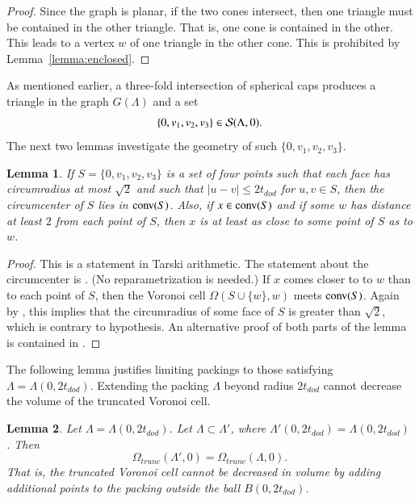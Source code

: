 \documentclass{article} %
\newtheorem{lemma}{Lemma}[subsection]
\begin{document}
\begin{proof} Since the graph is planar, if the two cones
intersect, then one triangle must be contained in the other
triangle.  That is, one cone is contained in the other.  This
leads to a vertex $w$ of one triangle in the other
cone.  This is prohibited
by Lemma~\ref{lemma:enclosed}.
\end{proof}

As mentioned earlier, a three-fold intersection of spherical
caps produces a triangle in the graph $G(\Lambda)$ and a 
set 
$$\{0,v_1,v_2,v_3\}\in {\mathcal S}(\Lambda,0).$$
The next two lemmas investigate the geometry of such $\{0,v_1,v_2,v_3\}$.

\begin{lemma}\label{lemma:Q}
If $S=\{0,v_1,v_2,v_3\}$ is a set of four points such that each
face has circumradius at most $\sqrt2$ and such that
$|u-v|\le 2t_{dod}$ for $u,v\in S$, then
the circumcenter of $S$ lies in ${\operatorname{conv}}(S)$.  Also, if $x
\in {\operatorname{conv}}(S)$ and if some $w$ has distance at least $2$ from each
point of $S$, then $x$ is at least as close to some point of $S$ as to
$w$.
\end{lemma}

\begin{proof} This is a statement in Tarski arithmetic.
The statement about the circumcenter is \cite[Lemma~5.18]{Hales:2006:DCG}.
(No reparametrization is needed.)
If $x$  comes closer to  to $w$  than to each point of $S$, then
the Voronoi cell $\Omega(S\cup\{w\},w)$ meets ${\operatorname{conv}}(S)$.
Again by \cite[Lemma~5.18]{Hales:2006:DCG}, this implies that the circumradius
of some face of $S$ is greater than $\sqrt2$, which is contrary
to hypothesis. An alternative proof 
of both parts of the lemma
is contained in \cite[Lemma~3.5,3.6]{Hales:2002:Dodec}.
\end{proof}

The following lemma justifies limiting packings to those
satisfying $\Lambda=\Lambda(0,2t_{dod})$.  Extending the packing
$\Lambda$ beyond radius $2t_{dod}$ cannot decrease the volume of the
truncated Voronoi cell.

\begin{lemma}\label{lemma:trunc}  
Let $\Lambda=\Lambda(0,2t_{dod})$.  Let $\Lambda\subset\Lambda'$,
where $\Lambda'(0,2t_{dod}) = \Lambda(0,2t_{dod})$.  Then
$$\Omega_{trunc}(\Lambda',0) = \Omega_{trunc}(\Lambda,0).
$$
That is, the truncated Voronoi cell cannot be decreased in volume by
adding additional points to the packing outside the ball $B(0,2t_{dod})$.
\end{lemma}
\end{document}
